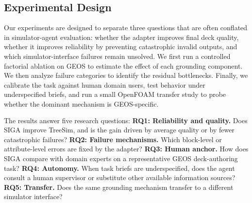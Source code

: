 \documentclass{article}
\begin{document}





\subsection{Experimental Design}

Our experiments are designed to separate three questions that are often conflated in simulator-agent evaluation: 
whether the adapter improves final deck quality, whether it improves reliability by preventing catastrophic invalid 
outputs, and which simulator-interface failures remain unsolved. We first run a controlled factorial ablation on GEOS 
to estimate the effect of each grounding component. We then analyze failure categories to identify the residual 
bottlenecks. Finally, we calibrate the task against human domain users, test behavior under underspecified briefs, 
and run a small OpenFOAM transfer study to probe whether the dominant mechanism is GEOS-specific.

The results answer five research questions:
\textbf{RQ1: Reliability and quality.} Does SIGA improve TreeSim, and is the gain driven by average quality or by fewer catastrophic failures?
\textbf{RQ2: Failure mechanisms.} Which block-level or attribute-level errors are fixed by the adapter?
\textbf{RQ3: Human anchor.} How does SIGA compare with domain experts on a representative GEOS deck-authoring task?
\textbf{RQ4: Autonomy.} When task briefs are underspecified, does the agent consult a human supervisor or substitute other available information sources?
\textbf{RQ5: Transfer.} Does the same grounding mechanism transfer to a different simulator interface?
\end{document}
